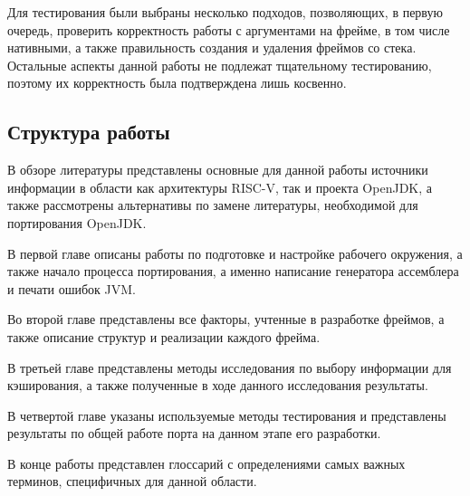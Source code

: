 Для тестирования были выбраны несколько подходов, позволяющих, в первую очередь, проверить корректность работы с аргументами на фрейме, в том числе нативными, а также правильность создания и удаления фреймов со стека. Остальные аспекты данной работы не подлежат тщательному тестированию, поэтому их корректность была подтверждена лишь косвенно.

\subsection*{Структура работы}

В обзоре литературы представлены основные для данной работы источники информации в области как архитектуры RISC-V, так и проекта OpenJDK, а также рассмотрены альтернативы по замене литературы, необходимой для портирования OpenJDK.

В первой главе описаны работы по подготовке и настройке рабочего окружения, а также начало процесса портирования, а именно написание генератора ассемблера и печати ошибок JVM.%

Во второй главе представлены все факторы, учтенные в разработке фреймов, а также описание структур и реализации каждого фрейма.

В третьей главе представлены методы исследования по выбору информации для кэширования, а также полученные в ходе данного исследования результаты. 

В четвертой главе указаны используемые методы тестирования и представлены результаты по общей работе порта на данном этапе его разработки.

В конце работы представлен глоссарий с определениями самых важных терминов, специфичных для данной области.

\renewcommand{\thefigure}{\arabic{section}.\arabic{figure}}